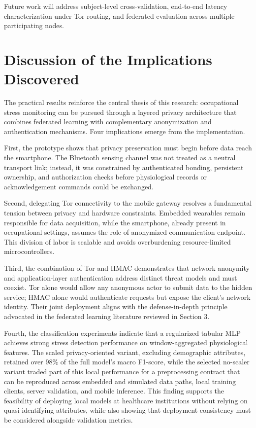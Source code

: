 \documentclass[12pt]{article}
\begin{document}
Future work will address subject-level cross-validation, end-to-end latency characterization under Tor routing, and federated evaluation across multiple participating nodes.

\section{Discussion of the Implications Discovered}

The practical results reinforce the central thesis of this research: occupational stress monitoring can be pursued through a layered privacy architecture that combines federated learning with complementary anonymization and authentication mechanisms. Four implications emerge from the implementation.

First, the prototype shows that privacy preservation must begin before data reach the smartphone. The Bluetooth sensing channel was not treated as a neutral transport link; instead, it was constrained by authenticated bonding, persistent ownership, and authorization checks before physiological records or acknowledgement commands could be exchanged.

Second, delegating Tor connectivity to the mobile gateway resolves a fundamental tension between privacy and hardware constraints. Embedded wearables remain responsible for data acquisition, while the smartphone, already present in occupational settings, assumes the role of anonymized communication endpoint. This division of labor is scalable and avoids overburdening resource-limited microcontrollers.

Third, the combination of Tor and HMAC demonstrates that network anonymity and application-layer authentication address distinct threat models and must coexist. Tor alone would allow any anonymous actor to submit data to the hidden service; HMAC alone would authenticate requests but expose the client's network identity. Their joint deployment aligns with the defense-in-depth principle advocated in the federated learning literature reviewed in Section 3.

Fourth, the classification experiments indicate that a regularized tabular MLP achieves strong stress detection performance on window-aggregated physiological features. The scaled privacy-oriented variant, excluding demographic attributes, retained over 98\% of the full model's macro F1-score, while the selected no-scaler variant traded part of this local performance for a preprocessing contract that can be reproduced across embedded and simulated data paths, local training clients, server validation, and mobile inference. This finding supports the feasibility of deploying local models at healthcare institutions without relying on quasi-identifying attributes, while also showing that deployment consistency must be considered alongside validation metrics.
\end{document}
